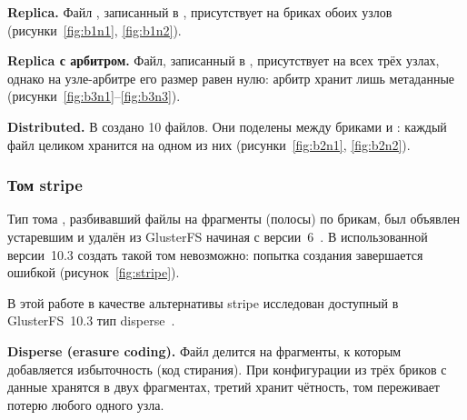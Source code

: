 \textbf{Replica.} Файл , записанный в , присутствует на бриках обоих узлов (рисунки~\ref{fig:b1n1}, \ref{fig:b1n2}).


\textbf{Replica с арбитром.} Файл, записанный в , присутствует на всех трёх узлах, однако на узле-арбитре  его размер равен нулю: арбитр хранит лишь метаданные (рисунки~\ref{fig:b3n1}--\ref{fig:b3n3}).


\textbf{Distributed.} В  создано 10 файлов. Они поделены между бриками  и : каждый файл целиком хранится на одном из них (рисунки~\ref{fig:b2n1}, \ref{fig:b2n2}).


\subsubsection{Том stripe}

Тип тома , разбивавший файлы на фрагменты (полосы) по брикам, был объявлен устаревшим и удалён из GlusterFS начиная с версии~6~\cite{gluster-upgrade-6,gluster-release-6}. В использованной версии~10.3 создать такой том невозможно: попытка создания завершается ошибкой (рисунок~\ref{fig:stripe}).

В этой работе в качестве альтернативы stripe исследован доступный в GlusterFS~10.3 тип disperse~\cite{gluster-volumes,gluster-103}.

\textbf{Disperse (erasure coding).} Файл делится на фрагменты, к которым добавляется избыточность (код стирания). При конфигурации из трёх бриков с  данные хранятся в двух фрагментах, третий хранит чётность, том переживает потерю любого одного узла.

